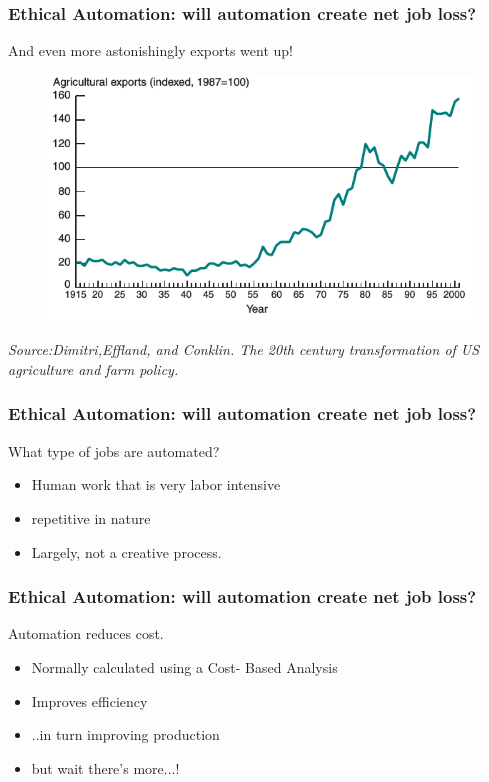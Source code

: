 \begin{frame}
	\frametitle{Ethical Automation: will automation create net job loss? }
	{\Large And even more astonishingly exports went up!}
	\begin{figure}[bht]
	\centering
	\includegraphics[scale= 0.4]{diagrams/agriculture-exports}
	\end{figure}
	\textit{Source:Dimitri,Effland, and Conklin. The 20th century transformation of US agriculture and farm policy.}
\end{frame}

\begin{frame}
	\frametitle{Ethical Automation: will automation create net job loss? }
	{\Large What type of jobs are automated?}
	\begin{itemize}
	\item Human work that is very labor intensive
	\item repetitive in nature
	\item Largely, not a creative process. 
	\end{itemize}
\end{frame}

\begin{frame}
	\frametitle{Ethical Automation: will automation create net job loss? }
	{\Large Automation reduces cost.}
	\begin{itemize}
	\item Normally calculated using a Cost- Based Analysis
	\item Improves efficiency
	\item ..in turn improving production
	\item but wait there's more...!
	\end{itemize}
\end{frame}

